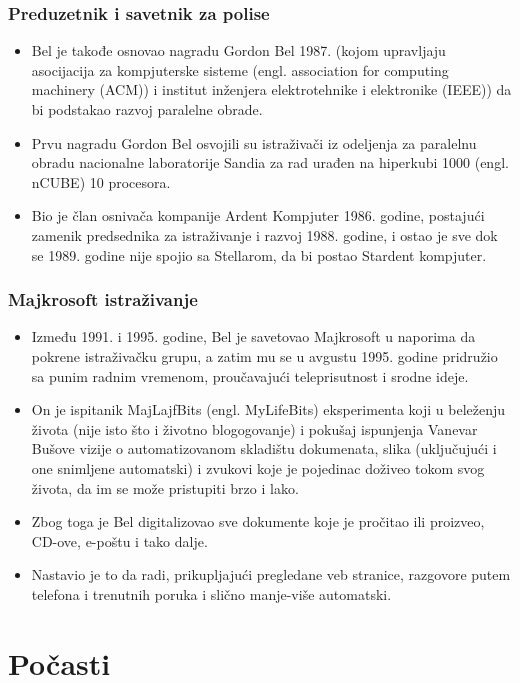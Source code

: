 \documentclass{beamer}
\begin{document}
\begin{frame}[fragile]\frametitle{Preduzetnik i savetnik za polise}
	\begin{itemize}	
		\item Bel je takođe osnovao nagradu Gordon Bel 1987. (kojom upravljaju asocijacija za kompjuterske sisteme (engl. association for computing machinery (ACM)) i institut inženjera elektrotehnike i elektronike (IEEE)) da bi podstakao razvoj paralelne obrade. 
		\item Prvu nagradu Gordon Bel osvojili su istraživači iz odeljenja za paralelnu obradu nacionalne laboratorije Sandia za rad urađen na hiperkubi 1000 (engl. nCUBE) 10 procesora.
	\item Bio je član osnivača kompanije Ardent Kompjuter 1986. godine, postajući zamenik predsednika za istraživanje i razvoj 1988. godine, i ostao je sve dok se 1989. godine nije spojio sa Stellarom, da bi postao Stardent kompjuter.
	\end{itemize}
\end{frame}
\begin{frame}[fragile]\frametitle{Majkrosoft istraživanje}
	\begin{itemize}	
		\item Između 1991. i 1995. godine, Bel je savetovao Majkrosoft u naporima da pokrene istraživačku grupu, a zatim mu se u avgustu 1995. godine pridružio sa punim radnim vremenom, proučavajući teleprisutnost i srodne ideje. 
		\item On je ispitanik MajLajfBits (engl. MyLifeBits) eksperimenta koji u beleženju života (nije isto što i životno blogogovanje) i pokušaj ispunjenja Vanevar Bušove vizije o automatizovanom skladištu dokumenata, slika (uključujući i one snimljene automatski) i zvukovi koje je pojedinac doživeo tokom svog života, da im se može pristupiti brzo i lako. 
		\item Zbog toga je Bel digitalizovao sve dokumente koje je pročitao ili proizveo, CD-ove, e-poštu i tako dalje.
		\item Nastavio je to da radi, prikupljajući pregledane veb stranice, razgovore putem telefona i trenutnih poruka i slično manje-više automatski.
	\end{itemize}
\end{frame}
\section{Počasti}
\end{document}
